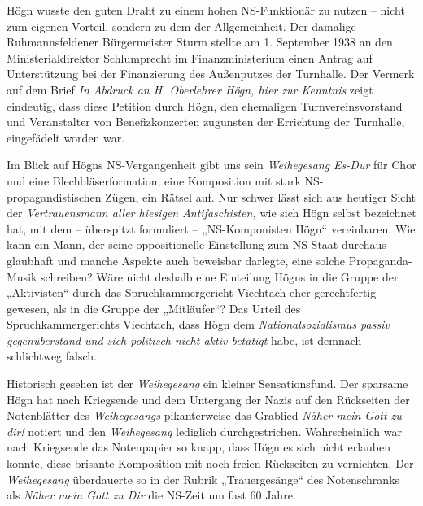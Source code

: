\documentclass{book}
\begin{document}

Högn wusste den guten Draht zu einem hohen NS-Funktionär zu nutzen –
nicht zum eigenen Vorteil, sondern zu dem der Allgemeinheit. Der
damalige Ruhmannsfeldener Bürgermeister Sturm stellte am 1. September
1938 an den Ministerialdirektor Schlumprecht im Finanzministerium einen
Antrag auf Unterstützung bei der Finanzierung des Außenputzes der
Turnhalle. Der Ver\-merk auf dem Brief \textit{In Abdruck an H.
Oberlehrer Högn, hier zur Kenntnis} zeigt ein\-deutig, dass diese
Petition durch Högn, den ehemaligen Turnvereinsvorstand und
Veranstalter von Benefizkonzerten zugunsten der Errichtung der
Turn\-halle, eingefädelt worden war.

Im Blick auf Högns NS-Vergangenheit gibt uns sein \textit{Weihegesang
Es-Dur} für Chor und eine Blechbläserformation, eine Komposition mit
stark NS-propa\-gandistischen Zügen, ein Rätsel auf. Nur schwer lässt
sich aus heutiger Sicht der \textit{Vertrauensmann aller hiesigen
Antifaschisten,} wie sich Högn selbst bezeichnet hat, mit dem –
überspitzt formuliert – „NS-Komponisten Högn“ vereinbaren. Wie kann ein
Mann, der seine oppositionelle Einstellung zum NS-Staat durch\-aus
glaubhaft und manche Aspekte auch beweisbar darlegte, eine solche
Pro\-paganda-Musik schreiben? Wäre nicht deshalb eine Einteilung Högns
in die Gruppe der „Aktivisten“ durch das Spruchkammergericht Viechtach
eher ge\-rechtfertig gewesen, als in die Gruppe der „Mitläufer“? Das
Urteil des Spruch\-kammergerichts Viechtach, dass Högn dem
\textit{Nationalsozialismus passiv gegenüber\-stand und sich politisch
nicht aktiv betätigt }habe, ist demnach schlichtweg falsch.


Historisch gesehen ist der \textit{Weihegesang} ein kleiner
Sensationsfund. Der sparsame Högn hat nach Kriegsende und dem Untergang
der Nazis auf den Rückseiten der Notenblätter des \textit{Weihegesangs}
pikanterweise das Grablied \textit{Näher mein Gott zu dir!} notiert und
den \textit{Weihegesang} lediglich durchgestrichen. Wahr\-scheinlich
war nach Kriegsende das Notenpapier so knapp, dass Högn es sich nicht
erlauben konnte, diese brisante Komposition mit noch freien Rückseiten
zu vernichten. Der \textit{Weihegesang} überdauerte so in der Rubrik
„Trauergesänge“ des Notenschranks als \textit{Näher mein Gott zu Dir}
die NS-Zeit um fast 60 Jahre.
\end{document}
